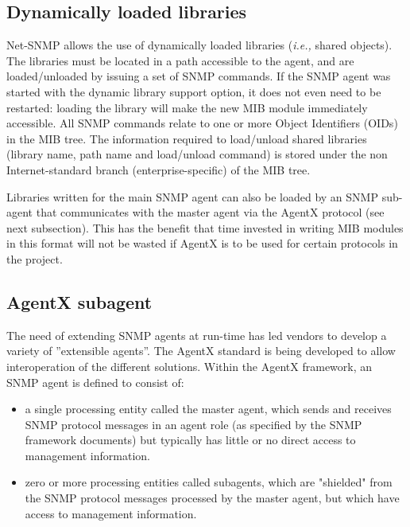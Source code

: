 \documentclass[11pt]{article}
\newcommand{\ie}{\emph{i.e.,}\xspace}
\begin{document}
\subsection{Dynamically loaded libraries}
Net-SNMP allows the use of dynamically loaded libraries (\ie shared objects).
The libraries must be located in a path accessible to the agent, and are
loaded/unloaded by issuing a set of SNMP commands.  If the SNMP agent was
started with the dynamic library support option, it does not even need to be
restarted:  loading the library will make the new MIB module immediately
accessible.
All SNMP commands relate to one or more Object Identifiers (OIDs) in the MIB
tree.  The information required to load/unload shared libraries (library name, 
path name and load/unload command) is stored under the non Internet-standard branch 
(enterprise-specific) of the MIB tree.
 
Libraries written for the main SNMP agent can also be loaded by an SNMP
sub-agent that communicates with the master agent via the AgentX protocol (see
next subsection).  This has the benefit that time invested in writing MIB modules in this format
will not be wasted if AgentX is to be used for certain protocols in the project. 

\subsection{AgentX subagent}

The need of extending SNMP agents at run-time has led vendors to develop a variety of
''extensible agents''.  The AgentX standard \cite{AgentX} is being developed to allow
interoperation of the different solutions.  Within the AgentX framework, an SNMP
agent is defined to consist of:

\begin{itemize}
\item a single processing entity called the master agent, which sends
      and receives SNMP protocol messages in an agent role (as
      specified by the SNMP framework documents) but typically has
      little or no direct access to management information.

\item zero or more processing entities called subagents, which are
      "shielded" from the SNMP protocol messages processed by the
      master agent, but which have access to management information.
\end{itemize}
\end{document}
